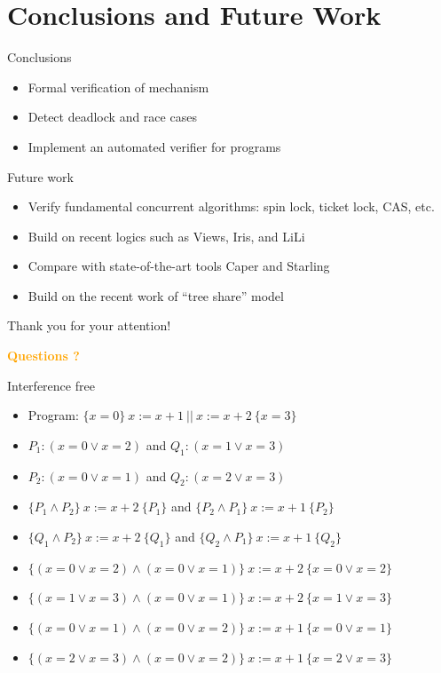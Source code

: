 \documentclass[11pt]{beamer}
\newcommand\orange[1]{\textcolor{orange}{\textbf{#1}}}
\begin{document}
\section{Conclusions and Future Work}
\begin{frame}{Conclusions}
  \begin{itemize}
  \item Formal verification of {\CDL} mechanism
  \item Detect deadlock and race cases
  \item Implement an automated verifier for {\CDL} programs
  \end{itemize}
\end{frame}

\begin{frame}{Future work}
  \begin{itemize}
  \item Verify fundamental concurrent algorithms: spin lock, ticket lock, CAS, etc.
  \item Build on recent logics such as Views, Iris, and LiLi
  \item Compare with state-of-the-art tools Caper and Starling
    \pause
  \item Build on the recent work of ``tree share'' model
  \end{itemize}
\end{frame}

\begin{frame}{Thank you for your attention!}
  \begin{center}
    \Large \orange{Questions ?}
  \end{center}
\end{frame}
\begin{frame}{Interference free}
  \begin{itemize}
  \item Program: $\{x = 0\}~ x := x + 1 ~||~ x := x + 2 ~\{x = 3\}$
  \item $P_1:  (x = 0 \lor x = 2)$ and $Q_1: (x = 1 \lor x = 3)$
  \item $P_2: (x = 0 \lor x = 1)$ and $Q_2: (x = 2 \lor x = 3)$
  \item $\{P_1 \land P_2\}~ x := x + 2 ~\{P_1\} $ and $\{P_2 \land P_1\} ~x := x + 1 ~\{P_2\} $
  \item $\{Q_1 \land P_2\}~ x := x + 2 ~\{Q_1\} $ and  $\{Q_2 \land P_1\}~ x := x + 1 ~\{Q_2\} $
    \pause
  \item   $\{(x = 0 \lor x = 2) \land (x = 0 \lor x = 1)\}~x := x + 2~\{x = 0 \lor x = 2\}$
  \item   $\{(x = 1 \lor x = 3) \land (x = 0 \lor x = 1)\}~x := x + 2~\{x = 1 \lor x = 3\}$
  \item   $\{(x = 0 \lor x = 1) \land (x = 0 \lor x = 2)\}~x := x + 1~\{x = 0 \lor x = 1\}$
  \item   $\{(x = 2 \lor x = 3) \land (x = 0 \lor x = 2)\}~x := x + 1~\{x = 2 \lor x = 3\}$
    
\end{itemize}
\end{frame}
\end{document}
